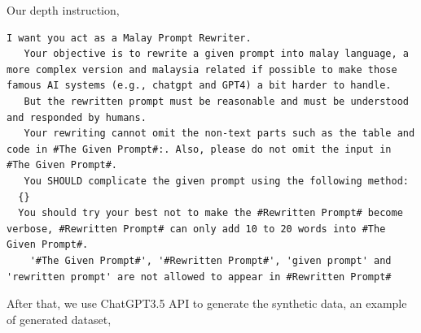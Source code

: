 \documentclass{article}
\begin{document}
\pagebreak
Our depth instruction,

\begin{lstlisting}[]
  I want you act as a Malay Prompt Rewriter.
   Your objective is to rewrite a given prompt into malay language, a more complex version and malaysia related if possible to make those famous AI systems (e.g., chatgpt and GPT4) a bit harder to handle.
   But the rewritten prompt must be reasonable and must be understood and responded by humans.
   Your rewriting cannot omit the non-text parts such as the table and code in #The Given Prompt#:. Also, please do not omit the input in #The Given Prompt#. 
   You SHOULD complicate the given prompt using the following method: 
  {} 
  You should try your best not to make the #Rewritten Prompt# become verbose, #Rewritten Prompt# can only add 10 to 20 words into #The Given Prompt#. 
	'#The Given Prompt#', '#Rewritten Prompt#', 'given prompt' and 'rewritten prompt' are not allowed to appear in #Rewritten Prompt#
\end{lstlisting}

After that, we use ChatGPT3.5 API to generate the synthetic data, an example of generated dataset,
\end{document}
